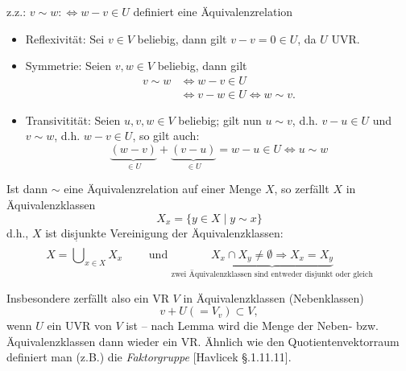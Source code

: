  	z.z.: $ v\sim w:\Leftrightarrow w-v\in U $ definiert eine Äquivalenzrelation

 	\begin{itemize}
 		\item Reflexivität: Sei $ v\in V $ beliebig, dann gilt $ v-v=0\in U $, da $ U $ UVR.
 		\item Symmetrie: Seien $ v,w\in V $ beliebig, dann gilt
 		      \begin{align*}
 		      	v\sim w & \Leftrightarrow w-v\in U                          \\
 		      	        & \Leftrightarrow v-w\in U \Leftrightarrow w\sim v.
 		      \end{align*}
 		\item Transivitität: Seien $ u,v,w\in V $ beliebig; gilt nun
 		      $u\sim v$, d.h. $v-u\in U$ und $v\sim w$, d.h. $w-v\in U$, so gilt auch:
 		      \[
 		      	\underbrace{(w-v)}_{\in U}+\underbrace{(v-u)}_{\in U}= w-u\in U \Leftrightarrow u\sim w
 		      \]
 	\end{itemize}

 	Ist dann $ \sim $ eine Äquivalenzrelation auf einer Menge $ X $, so zerfällt $ X $ in Äquivalenzklassen
 	\[
 		X_x = \{y\in X\mid y\sim x\}
 	\]
 	d.h., $ X $ ist disjunkte Vereinigung der Äquivalenzklassen:
 	\[
 		X = \dot{\bigcup}_{x\in X}X_x \qquad\text{ und } \underbrace{X_x \cap X_y \neq \emptyset \Rightarrow X_x = X_y}_{\text{zwei Äquivalenzklassen sind entweder disjunkt oder gleich}}
 	\]

 	Insbesondere zerfällt also ein VR $ V $ in Äquivalenzklassen (Nebenklassen)
 	\[
 		v+U (= V_v)\subset V,
 	\]
 	wenn $ U $ ein UVR von $ V $ ist -- nach Lemma wird die Menge der Neben- bzw. Äquivalenzklassen dann wieder ein VR. Ähnlich wie den Quotientenvektorraum definiert man (z.B.) die \emph{Faktorgruppe} [Havlicek §.1.11.11].

